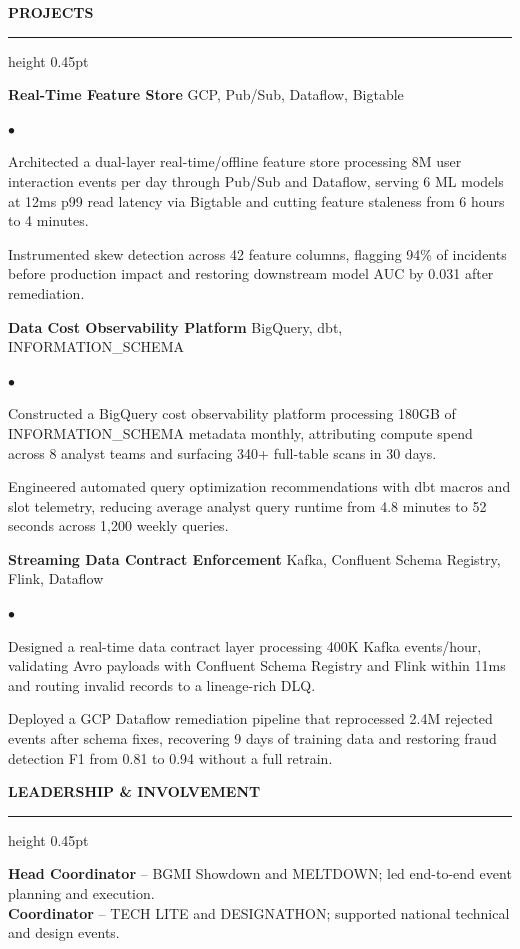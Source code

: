 \documentclass[10pt,letterpaper]{article}
\newcommand{\ressection}[1]{%
  \vspace{2.5pt}
  {\color{sectionblue}\bfseries\MakeUppercase{#1}}\par
  \vspace{1pt}
  {\color{sectionblue}\hrule height 0.45pt}
  \vspace{2pt}
}
\newenvironment{reslist}{%
  \begin{list}{$\bullet$}{%
    \setlength{\leftmargin}{1.05em}
    \setlength{\itemsep}{0.45pt}
    \setlength{\parsep}{0pt}
    \setlength{\topsep}{1pt}
    \setlength{\partopsep}{0pt}
  }
}{\end{list}}
\newcommand{\project}[2]{%
  \textbf{#1} \textbar{} #2\par
}
\begin{document}
\ressection{Projects}
\project{Real-Time Feature Store}{GCP, Pub/Sub, Dataflow, Bigtable}
\begin{reslist}
  \item Architected a dual-layer real-time/offline feature store processing 8M user interaction events per day through Pub/Sub and Dataflow, serving 6 ML models at 12ms p99 read latency via Bigtable and cutting feature staleness from 6 hours to 4 minutes.
  \item Instrumented skew detection across 42 feature columns, flagging 94\% of incidents before production impact and restoring downstream model AUC by 0.031 after remediation.
\end{reslist}

\project{Data Cost Observability Platform}{BigQuery, dbt, INFORMATION\_SCHEMA}
\begin{reslist}
  \item Constructed a BigQuery cost observability platform processing 180GB of INFORMATION\_SCHEMA metadata monthly, attributing compute spend across 8 analyst teams and surfacing 340+ full-table scans in 30 days.
  \item Engineered automated query optimization recommendations with dbt macros and slot telemetry, reducing average analyst query runtime from 4.8 minutes to 52 seconds across 1,200 weekly queries.
\end{reslist}

\project{Streaming Data Contract Enforcement}{Kafka, Confluent Schema Registry, Flink, Dataflow}
\begin{reslist}
  \item Designed a real-time data contract layer processing 400K Kafka events/hour, validating Avro payloads with Confluent Schema Registry and Flink within 11ms and routing invalid records to a lineage-rich DLQ.
  \item Deployed a GCP Dataflow remediation pipeline that reprocessed 2.4M rejected events after schema fixes, recovering 9 days of training data and restoring fraud detection F1 from 0.81 to 0.94 without a full retrain.
\end{reslist}

\ressection{Leadership \& Involvement}
\textbf{Head Coordinator} -- BGMI Showdown and MELTDOWN; led end-to-end event planning and execution.\\
\textbf{Coordinator} -- TECH LITE and DESIGNATHON; supported national technical and design events.
\end{document}
